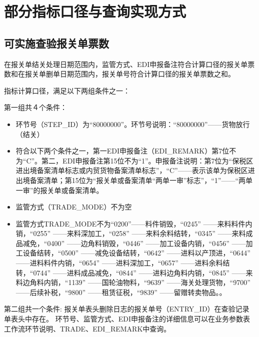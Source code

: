 \documentclass[a4paper]{tufte-book}%
\theoremstyle{definition}
\theoremstyle{definition}
\begin{document}
\section{部分指标口径与查询实现方式}

\subsection{可实施查验报关单票数}
在报关单结关处理日期范围内，监管方式、EDI申报备注符合计算口径的报关单票数和在报关单删单日期范围内，报关单号符合计算口径的报关单票数之和。

指标计算口径，满足以下两组条件之一：

第一组共４个条件：
\begin{itemize}
	\item 环节号（STEP\_ID）为“80000000”。环节号说明：“80000000”——货物放行（结关）
	\item 符合以下两个条件之一，第一EDI申报备注（EDI\_REMARK）第7位不为“C”。第二，EDI申报备注第15位不为“1”。申报备注说明：第7位为“保税区进出境备案清单标志或内贸货物备案清单标志”，“C”——表示该单为保税区进出境备案清单；第15位为“报关单或备案清单“两单一审”标志”，“1”——“两单一审”的报关单或备案清单。
	\item 监管方式（TRADE\_MODE）不为空
	\item 监管方式TRADE\_MODE不为“0200”——料件销毁，“0245” ——来料料件内销，“0255” ——来料深加工，“0258” ——来料余料结转，“0345” ——来料成品减免，“0400” ——边角料销毁，“0446” ——加工设备内销，“0456” ——加工设备结转，“0500” ——减免设备结转，“0642” ——进料以产顶进，“0644” ——进料料件内销，“0654” ——进料深加工，“0657” ——进料余料结转，“0744” ——进料成品减免，“0844” ——进料边角料内销，“0845” ——来料边角料内销，“1139” ——国轮油物料，“9639” ——海关处理货物，“9700” ——后续补税，“9800” ——租赁征税，“9839” ——留赠转卖物品。。
\end{itemize}


第二组共一个条件:
 报关单表头删除日志的报关单号（ENTRY\_ID）在查验记录单表头中存在。
环节号、监管方式、EDI申报备注的详细信息可以在业务参数表工作流环节说明、TRADE、EDI\_REMARK中查询。
\end{document}
